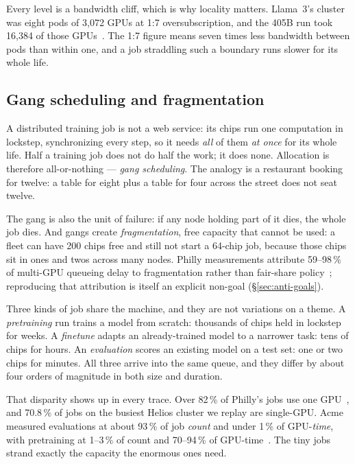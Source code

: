 Every level is a bandwidth cliff, which is why locality matters. Llama~3's
cluster was eight pods of 3{,}072 GPUs at 1:7 oversubscription, and the 405B run
took 16{,}384 of those GPUs~\cite{llama3}. The 1:7 figure means seven times less
bandwidth between pods than within one, and a job straddling such a boundary
runs slower for its whole life.

\subsection{Gang scheduling and fragmentation}

A distributed training job is not a web service: its chips run one computation in
lockstep, synchronizing every step, so it needs \emph{all} of them \emph{at once}
for its whole life. Half a training job does not do half
the work; it does none. Allocation is therefore all-or-nothing --- \emph{gang
scheduling}. The analogy is a restaurant booking for twelve: a table for eight
plus a table for four across the street does not seat twelve.

The gang is also the unit of failure: if any node holding part of it dies, the
whole job dies. And gangs create \emph{fragmentation}, free capacity that cannot
be used: a fleet can have 200 chips free and still not start a 64-chip job,
because those chips sit in ones and twos across many nodes. Philly
measurements attribute 59--98\,\% of multi-GPU queueing delay to fragmentation
rather than fair-share policy~\cite{philly2019}; reproducing that attribution is
itself an explicit non-goal (\S\ref{sec:anti-goals}).

Three kinds of job share the machine, and they are not variations on a theme.
A \emph{pretraining} run trains a model from scratch: thousands of chips held in
lockstep for weeks. A \emph{finetune} adapts an already-trained model to a
narrower task: tens of chips for hours. An \emph{evaluation} scores an existing
model on a test set: one or two chips for minutes. All three arrive into the
same queue, and they differ by about four orders of magnitude in both size and
duration.

That disparity shows up in every trace. Over 82\,\% of Philly's jobs use one
GPU~\cite{philly2019}, and 70.8\,\% of jobs on the busiest Helios cluster we
replay are single-GPU. Acme measured evaluations at about 93\,\% of job
\emph{count} and under 1\,\% of GPU-\emph{time}, with pretraining at 1--3\,\% of
count and 70--94\,\% of GPU-time~\cite{acme2024}. The tiny jobs strand exactly
the capacity the enormous ones need.

